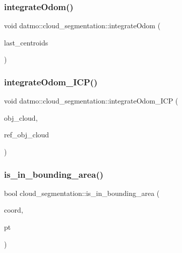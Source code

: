 \subsubsection{\texorpdfstring{integrate\+Odom()}{integrateOdom()}}
{\footnotesize\ttfamily void datmo\+::cloud\+\_\+segmentation\+::integrate\+Odom (\begin{DoxyParamCaption}\item[{pcl\+::\+Point\+Cloud$<$ pcl\+::\+Point\+X\+YZ $>$ \&}]{last\+\_\+centroids }\end{DoxyParamCaption})\hspace{0.3cm}{\ttfamily [private]}}

\mbox{\label{classdatmo_1_1cloud__segmentation_ab2a36cd996f3d1eb002a357008836ef6}} 
\subsubsection{\texorpdfstring{integrate\+Odom\+\_\+\+I\+C\+P()}{integrateOdom\_ICP()}}
{\footnotesize\ttfamily void datmo\+::cloud\+\_\+segmentation\+::integrate\+Odom\+\_\+\+I\+CP (\begin{DoxyParamCaption}\item[{const pcl\+::\+Point\+Cloud$<$ pcl\+::\+Point\+X\+YZ $>$\+::Const\+Ptr \&}]{obj\+\_\+cloud,  }\item[{const pcl\+::\+Point\+Cloud$<$ pcl\+::\+Point\+X\+YZ $>$\+::Ptr \&}]{ref\+\_\+obj\+\_\+cloud }\end{DoxyParamCaption})\hspace{0.3cm}{\ttfamily [private]}}

\mbox{\label{classdatmo_1_1cloud__segmentation_a5bcf85ac924671c64840ac2087877a5f}} 
\subsubsection{\texorpdfstring{is\+\_\+in\+\_\+bounding\+\_\+area()}{is\_in\_bounding\_area()}}
{\footnotesize\ttfamily bool cloud\+\_\+segmentation\+::is\+\_\+in\+\_\+bounding\+\_\+area (\begin{DoxyParamCaption}\item[{const pcl\+::\+Point\+Cloud$<$ pcl\+::\+Point\+X\+YZ $>$\+::Ptr \&}]{coord,  }\item[{pcl\+::\+Point\+X\+Y\+Z\+R\+GB}]{pt }\end{DoxyParamCaption})\hspace{0.3cm}{\ttfamily [private]}}

